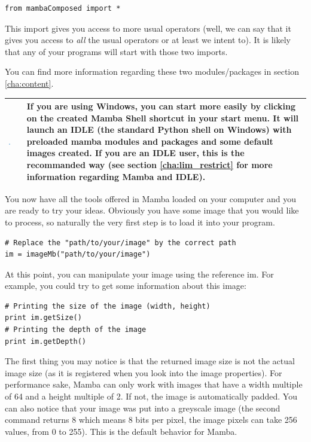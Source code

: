 \documentclass[a4paper,10pt,oneside]{article}
\newenvironment{tipBox}
{
    \begin{center}
    \begin{tabular}{ | b{0.1\textwidth} b{0.8\textwidth} | }
    \hline
    \rowcolor{lightblue}
    \includegraphics[width=0.1\textwidth]{Crystal_Clear_action_info.png} &
}
{
    \\
    \hline
    \end{tabular}
    \end{center}
}
\begin{document}
\lstset{language=Python}
\begin{lstlisting}
from mambaComposed import *
\end{lstlisting}

This import gives you access to more usual operators (well, we can say that it
gives you access to \emph{all} the usual operators or at least we intent to).
It is likely that any of your programs will start with those two imports.

You can find more information regarding these two modules/packages in section 
\ref{cha:content}.

\begin{tipBox}
If you are using Windows, you can start more easily by clicking on the created
Mamba Shell shortcut in your start menu. It will launch an IDLE (the standard
Python shell on Windows) with preloaded mamba modules and packages and some 
default images created. If you are an IDLE user, this is the
recommanded way (see section \ref{cha:lim_restrict} for more information
regarding Mamba and IDLE).
\end{tipBox}

You now have all the tools offered in Mamba loaded on your computer and you are
ready to try your ideas. Obviously you have some image that you would like to
process, so naturally the very first step is to load it into your program.

\lstset{language=Python}
\begin{lstlisting}
# Replace the "path/to/your/image" by the correct path
im = imageMb("path/to/your/image")
\end{lstlisting}

At this point, you can manipulate your image using the reference im. For example,
you could try to get some information about this image:

\lstset{language=Python}
\begin{lstlisting}
# Printing the size of the image (width, height)
print im.getSize()
# Printing the depth of the image 
print im.getDepth()
\end{lstlisting}

The first thing you may notice is that the returned image size is not the actual
image size (as it is registered when you look into the image properties). For
performance sake, Mamba can only work with images that have a width multiple of 64
and a height multiple of 2. If not, the image is automatically padded. You can 
also notice that your image was put into a greyscale image (the second command 
returns 8 which means 8 bits per pixel, the image pixels can take 256 values, from 
0 to 255). This is the default behavior for Mamba.
\end{document}
